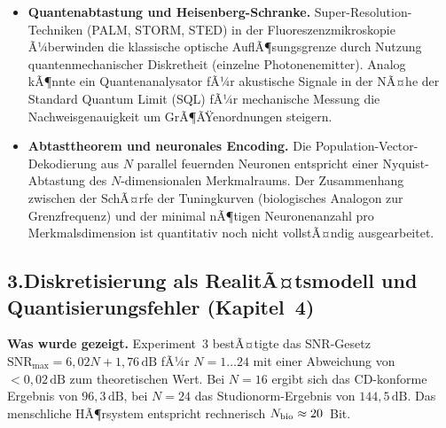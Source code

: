 ﻿\documentclass[12pt,a4paper,titlepage]{report}
\begin{document}
\begin{itemize}[leftmargin=2em]
    fÃ¼r WellenlÃ¤ngen $\lambda < 2d$.
    Das Nyquist-Kriterium Ã¼bertrÃ¤gt sich nach
    $f_{s,\mathrm{spatial}} = 1/(2d) \geq k_{\max}/\pi$
    direkt auf den Wellenzahlraum.
    Die Verbindung zur Katzenpinna (verteilte rÃ¤umliche Apertur) und zur
    Kochlea (verteilte spektrale AuflÃ¶sung) ist eine theoretisch
    fruchtbare Forschungsrichtung.
  \item \textbf{Quantenabtastung und Heisenberg-Schranke.}
    Super-Resolution-Techniken (PALM, STORM, STED) in der Fluoreszenzmikroskopie
    Ã¼berwinden die klassische optische AuflÃ¶sungsgrenze durch Nutzung
    quantenmechanischer Diskretheit (einzelne Photonenemitter).
    Analog kÃ¶nnte ein Quantenanalysator fÃ¼r akustische Signale in der
    NÃ¤he der Standard Quantum Limit (SQL) fÃ¼r mechanische Messung die
    Nachweisgenauigkeit um GrÃ¶ÃŸenordnungen steigern.
  \item \textbf{Abtasttheorem und neuronales Encoding.}
    Die Population-Vector-Dekodierung aus $N$ parallel feuernden
    Neuronen entspricht einer Nyquist-Abtastung des
    $N$-dimensionalen Merkmalraums.
    Der Zusammenhang zwischen der SchÃ¤rfe der Tuningkurven
    (biologisches Analogon zur Grenzfrequenz) und der minimal
    nÃ¶tigen Neuronenanzahl pro Merkmalsdimension ist quantitativ
    noch nicht vollstÃ¤ndig ausgearbeitet.
\end{itemize}

\subsection*{3.\enspace Diskretisierung als RealitÃ¤tsmodell und
Quantisierungsfehler (Kapitel~4)}

\textbf{Was wurde gezeigt.}
Experiment~3 bestÃ¤tigte das SNR-Gesetz
$\mathrm{SNR}_{\max} = 6{,}02N + 1{,}76\,\mathrm{dB}$
fÃ¼r $N=1\ldots 24$ mit einer Abweichung von $< 0{,}02\,\mathrm{dB}$
zum theoretischen Wert.
Bei $N=16$ ergibt sich das CD-konforme Ergebnis von $96{,}3\,\mathrm{dB}$,
bei $N=24$ das Studionorm-Ergebnis von $144{,}5\,\mathrm{dB}$.
Das menschliche HÃ¶rsystem entspricht rechnerisch $N_{\rm bio}\approx 20$~Bit.
\end{document}
